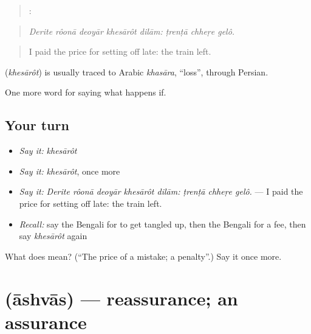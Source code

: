 \begin{quote}
    :   
\end{quote}

\begin{quote}
\emph{Derite rôonā deoyār khesārôt dilām: ṭrenṭā chheṛe gelô.}
\end{quote}

\begin{quote}
I paid the price for setting off late: the train left.
\end{quote}

\begin{cousinweb}
\textbf{} (\emph{khesārôt}) is usually traced to Arabic \emph{khasāra}, \textquotedblleft{}loss\textquotedblright{}, through Persian.
\end{cousinweb}

\begin{grammarlens}[title={What you've built}]
One more word for saying what happens if.
\end{grammarlens}

\subsection*{Your turn}
\begin{itemize}
\raggedright
  \item \emph{Say it:} \emph{khesārôt}
  \item \emph{Say it:} \emph{khesārôt}, once more
  \item \emph{Say it:} \emph{Derite rôonā deoyār khesārôt dilām: ṭrenṭā chheṛe gelô.} — I paid the price for setting off late: the train left.
  \item \emph{Recall:} say the Bengali for to get tangled up, then the Bengali for a fee, then say \emph{khesārôt} again
\end{itemize}

\begin{tcolorbox}[breakable,colback=teal!4,colframe=teal!35!black,title={Before you move on}]
What does  mean? (\textquotedblleft{}The price of a mistake; a penalty\textquotedblright{}.) Say it once more.
\end{tcolorbox}
\section[\texorpdfstring{\bn{আশ্বাস} (āshvās)}{আশ্বাস (āshvās)}]{ (āshvās) — reassurance; an assurance}

